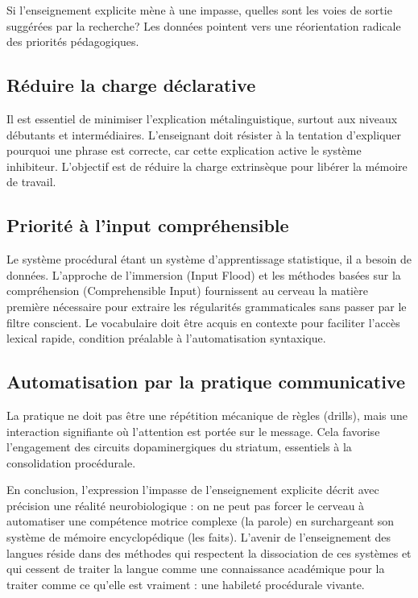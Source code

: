 Si l'enseignement explicite mène à une impasse, quelles sont les voies de sortie suggérées par la
recherche? Les données pointent vers une réorientation radicale des priorités pédagogiques.



\subsection{Réduire la charge déclarative}

Il est essentiel de minimiser l'explication métalinguistique, surtout aux niveaux débutants et
intermédiaires. L'enseignant doit résister à la tentation d'expliquer \og pourquoi\fg{} une phrase
est correcte, car cette explication active le système inhibiteur. L'objectif est de réduire la
charge extrinsèque pour libérer la mémoire de travail.\cite{II-2-2-ref22}



\subsection{Priorité à l'input compréhensible}

Le système procédural étant un système d'apprentissage statistique, il a besoin de données.
L'approche de l'immersion (\og Input Flood\fg{}) et les méthodes basées sur la compréhension
(Comprehensible Input) fournissent au cerveau la matière première nécessaire pour extraire les
régularités grammaticales sans passer par le filtre conscient.\cite{II-2-2-ref23} Le vocabulaire
doit être acquis en contexte pour faciliter l'accès lexical rapide, condition préalable à
l'automatisation syntaxique.\cite{II-2-2-ref37}



\subsection{Automatisation par la pratique communicative}

La pratique ne doit pas être une répétition mécanique de règles (drills), mais une interaction
signifiante où l'attention est portée sur le message. Cela favorise l'engagement des circuits
dopaminergiques du striatum, essentiels à la consolidation procédurale.\cite{II-2-2-ref51}

En conclusion, l'expression \og l'impasse de l'enseignement explicite\fg{} décrit avec précision une
réalité neurobiologique : on ne peut pas forcer le cerveau à automatiser une compétence motrice
complexe (la parole) en surchargeant son système de mémoire encyclopédique (les faits). L'avenir de
l'enseignement des langues réside dans des méthodes qui respectent la dissociation de ces systèmes
et qui cessent de traiter la langue comme une connaissance académique pour la traiter comme ce
qu'elle est vraiment : une habileté procédurale vivante.

